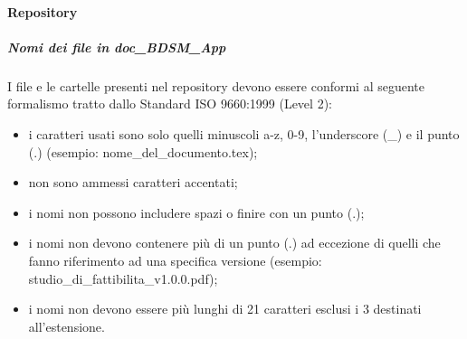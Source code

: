			\paragraph{Repository}
				\subparagraph{Nomi dei file in doc\_BDSM\_App}
				I file e le cartelle presenti nel repository devono essere conformi al seguente formalismo tratto dallo Standard ISO 9660:1999 (Level 2):
					\begin{itemize}
						\item i caratteri usati sono solo quelli minuscoli a-z, 0-9, l'underscore (\_) e il punto (.) (esempio: nome\_del\_documento.tex);
						\item non sono ammessi caratteri accentati;
						\item i nomi non possono includere spazi o finire con un punto (.);
						\item i nomi non devono contenere più di un punto (.) ad eccezione di quelli che fanno riferimento ad una specifica versione (esempio: studio\_di\_fattibilita\_v1.0.0.pdf);
						\item i nomi non devono essere più lunghi di 21 caratteri esclusi i 3 destinati all'estensione.
					\end{itemize}

